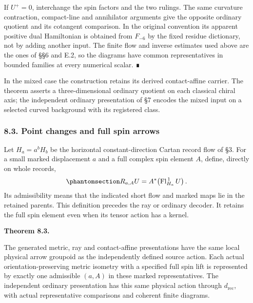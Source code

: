 \documentclass[
  english,
  11pt,
  reqno]{amsart}
\makeatletter
\newcommand{\pandocstatementheading}[1]{%
  \par\addpenalty{\@beginparpenalty}%
  \addvspace{.5\baselineskip plus .2\baselineskip minus .2\baselineskip}%
  {\normalfont\bfseries #1\par}%
  \nobreak\@afterindenttrue\@afterheading
}
\makeatother
\begin{document}
If \(U^+=0\), interchange the spin factors and the two rulings. The same
curvature contraction, compact-line and annihilator arguments give the
opposite ordinary quotient and its cotangent comparison. In the original
convention its apparent positive dual Hamiltonian is obtained from
\(F_{-6}\) by the fixed residue dictionary, not by adding another input.
The finite flow and inverse estimates used above are the ones of §§6 and
E.2, so the diagrams have common representatives in bounded families at
every numerical scalar. ∎

In the mixed case the construction retains its derived contact-affine
carrier. The theorem asserts a three-dimensional ordinary quotient on
each classical chiral axis; the independent ordinary presentation of §7
encodes the mixed input on a selected curved background with its
registered class.

\protect{}\label{sec:gg-physical-spin-arrows}

\subsubsection{8.3. Point changes and full spin
arrows}\label{point-changes-and-full-spin-arrows}

Let \(H_a=a^bH_b\) be the horizontal constant-direction Cartan record
flow of §3. For a small marked displacement \(a\) and a full complex
spin element \(A\), define, directly on whole records,
\begin{equation}\protect\phantomsection\label{eq:gg-independent-source-physical-action}{
 R_{a,A}U=A^*\!\left(\operatorname{Fl}_{H_a}^{\,1}U\right).
}\end{equation} Its admissibility means that the indicated short flow
and marked maps lie in the retained parents. This definition precedes
the ray or ordinary decoder. It retains the full spin element even when
its tensor action has a kernel.

\pandocstatementheading{\protect{}\label{thm:gg-full-spin-physical-homs}Theorem 8.3.}

The generated metric, ray and contact-affine presentations have the same
local physical arrow groupoid as the independently defined source
action. Each actual orientation-preserving metric isometry with a
specified full spin lift is represented by exactly one admissible
\((a,A)\) in these marked representatives. The independent ordinary
presentation has this same physical action through \(d_{\mathrm{rec}}\),
with actual representative comparisons and coherent finite diagrams.
\end{document}
